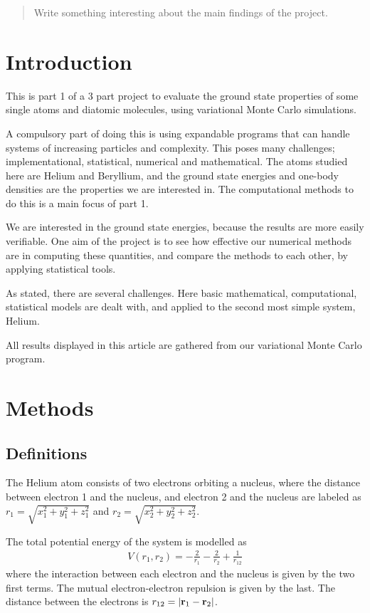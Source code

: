 \documentclass[twocolumn]{article}[10pt]
\newcommand{\eq}[1]{\begin{align*}#1\end{align*}}
\renewcommand\vec[1]{{\bf #1}}
\begin{document}
\begin{abstract}
Write something interesting about the main findings of the project.
\end{abstract}


\section{Introduction}
This is part 1 of a 3 part project to evaluate the ground state properties of 
some single atoms and diatomic molecules, 
using variational Monte Carlo simulations. 

A compulsory part of doing this is using expandable programs that can handle 
systems of increasing particles and complexity. 
This poses many challenges; implementational, statistical, 
numerical and mathematical. 
The atoms studied here are Helium and Beryllium, 
and the ground state energies and one-body densities are the properties
we are interested in. The computational methods to do this is a main focus of 
part 1. 

We are interested in the ground state energies, because the
results are more easily verifiable. One aim of the project is
to see how effective our numerical methods are in computing
these quantities, and compare the methods to each other,
by applying statistical tools.

As stated, there are several challenges. Here basic mathematical,
computational, statistical models are dealt with, and applied to the second 
most simple system, Helium. 

All results displayed in this article are 
gathered from our variational Monte Carlo program. 

\section{Methods}
\subsection{Definitions}
The Helium atom consists of two electrons orbiting a nucleus,
where the distance between electron 1 and the nucleus,
and electron 2 and the nucleus are labeled as
$r_1 = \sqrt{x_1^2 + y_1^2 + z_1^2}$ 
and $r_2 = \sqrt{x_2^2 + y_2^2 + z_2^2}$.

The total potential energy of the system is modelled as
{\small
\eq{
    V(r_1,r_2)=-\frac{2}{r_1}-\frac{2}{r_2}+\frac{1}{r_{12}}
}}%
where the interaction between each electron and the nucleus
is given by the two first terms. 
The mutual electron-electron repulsion is given by the last.
The distance between the electrons is $r_{12}=|\vec r_1-\vec r_2|$.
\end{document}
